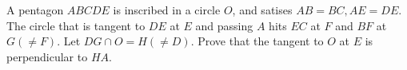 A pentagon $ABCDE$ is inscribed in a circle $O$, and satises $AB = BC , AE =  DE$. The circle that is tangent to $DE$ at $E$ and passing $A$ hits $EC$ at $F$ and $BF$ at $G (\ne F)$. Let $DG\cap O = H (\ne D)$. Prove that the tangent to $O$ at $E$ is perpendicular to $HA$.